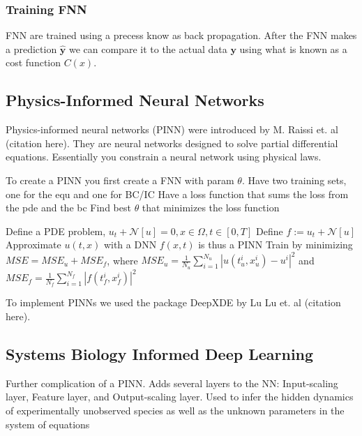 \subsubsection{Training FNN}


FNN are trained using a precess know as back propagation. After the FNN makes a prediction $\hat{\mathbf{y}}$ we can compare it to the actual data $\mathbf{y}$ using what is known as a cost function $C(x)$. 	



\subsection{Physics-Informed Neural Networks}

Physics-informed neural networks (PINN) were introduced by M. Raissi et. al (citation here). 
They are neural networks designed to solve partial differential equations. 
Essentially you constrain a neural network using physical laws.

To create a PINN you first create a FNN with param $\theta$.
Have two training sets, one for the equ and one for BC/IC
Have a loss function that sums the loss from the pde and the bc
Find best $\theta$ that minimizes the loss function

Define a PDE problem, $u_{t}+\mathcal{N}[u]=0, x \in \Omega, t \in[0, T]$
Define $f:=u_{t}+\mathcal{N}[u]$
Approximate $u(t,x)$ with a DNN
$f(x,t)$ is thus a PINN 
Train by minimizing $M S E=M S E_{u}+M S E_{f}$, where $M S E_{u}=\frac{1}{N_{u}} \sum_{i=1}^{N_{u}}\left|u\left(t_{u}^{i}, x_{u}^{i}\right)-u^{i}\right|^{2}$ and $M S E_{f}=\frac{1}{N_{f}} \sum_{i=1}^{N_{f}}\left|f\left(t_{f}^{i}, x_{f}^{i}\right)\right|^{2}$

To implement PINNs we used the package DeepXDE by Lu Lu et. al (citation here). 








\subsection{Systems Biology Informed Deep Learning}

Further complication of a PINN. 
Adds several layers to the NN: Input-scaling layer, Feature layer, and Output-scaling layer.
Used to infer the hidden dynamics of experimentally unobserved species as well as the unknown parameters in the system of equations

